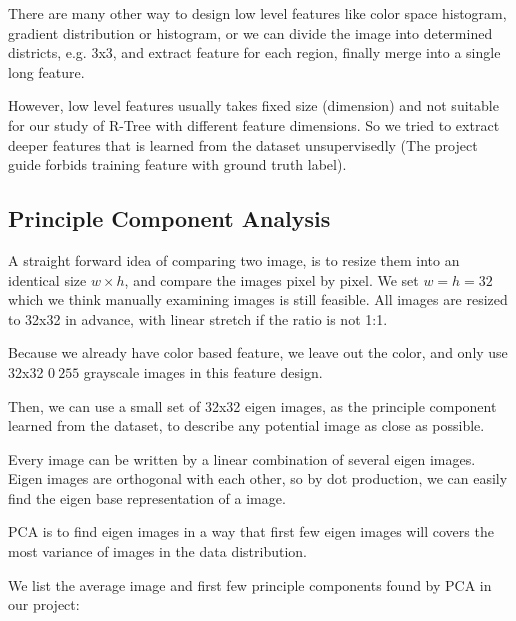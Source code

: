 \documentclass{acm_proc_article-sp}
\begin{document}
There are many other way to design low level features like color space histogram,
gradient distribution or histogram, or we can divide the image into determined
districts, e.g. 3x3, and extract feature for each region, finally merge into a
single long feature.

However, low level features usually takes fixed size (dimension) and not
suitable for our study of R-Tree with different feature dimensions. So we tried
to extract deeper features that is learned from the dataset unsupervisedly (The
project guide forbids training feature with ground truth label).

\subsection{Principle Component Analysis}
A straight forward idea of comparing two image, is to resize them into an
identical size $w\times h$, and compare the images pixel by pixel. We set
$w=h=32$ which we think manually examining images is still feasible. All images
are resized to 32x32 in advance, with linear stretch if the ratio is not 1:1.

Because we already have color based feature, we leave out the color, and only use 32x32 $0~255$
grayscale images in this feature design.

Then, we can use a small set of 32x32 eigen images, as the principle
component learned from the dataset, to describe any potential image as close as
possible.

Every image can be written by a linear combination of several eigen images.
Eigen images are orthogonal with each other, so by dot production, we can
easily find the eigen base representation of a image.

PCA is to find eigen images in a way that first few eigen images will covers
the most variance of images in the data distribution.

We list the average image and first few principle components found by PCA in
our project:
\end{document}
